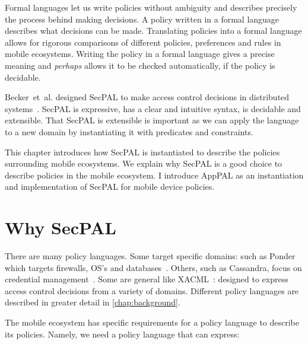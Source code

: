\documentclass[thesis.tex]{subfiles}
\begin{document}
Formal languages let us write policies without ambiguity and describes
precisely the process behind making decisions. A policy written in a
formal language describes what decisions can be made. Translating
policies into a formal language allows for rigorous comparisons of
different policies, preferences and rules in mobile
ecosystems. Writing the policy in a formal language gives a precise
meaning and \emph{perhaps} allows it to be checked automatically, if
the policy is decidable.

Becker~et~al{.} designed SecPAL to make access control decisions in
distributed systems~\cite{becker_secpal:_2006}. SecPAL is expressive,
has a clear and intuitive syntax, is decidable and extensible. That
SecPAL is extensible is important as we can apply the language to a
new domain by instantiating it with predicates and constraints.

This chapter introduces how SecPAL is instantiated to describe the
policies surrounding mobile ecosystems. We explain why SecPAL is a
good choice to describe policies in the mobile ecosystem. I introduce
AppPAL as an instantiation and implementation of SecPAL for mobile
device policies.

\section{Why SecPAL}
\label{sec:why-apppal}

There are many policy languages. Some target specific domains: such as
Ponder which targets firewalls, OS's and
databases~\cite{damianou_ponder_2001}. Others, such as Cassandra,
focus on credential management~\cite{becker_cassandra:_2004}.  Some
are general like XACML~\cite{oasis_extensible_2013}: designed to
express access control decisions from a variety of domains. Different
policy languages are described in greater detail in
\autoref{chap:background}.

The mobile ecosystem has specific requirements for a policy language
to describe its policies. Namely, we need a policy language that can
express:
\end{document}
